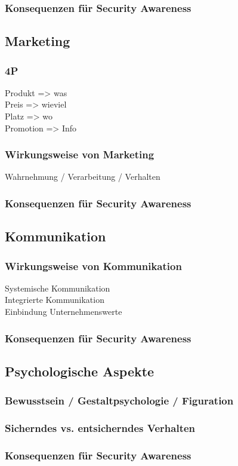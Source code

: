 \documentclass[../../main.tex]{subfiles}
\begin{document}
\subsubsection{Konsequenzen für Security Awareness}
\subsection{Marketing}
\subsubsection{4P}
    Produkt => was\\
    Preis => wieviel\\
    Platz => wo\\
    Promotion => Info
\subsubsection{Wirkungsweise von Marketing}
    Wahrnehmung / Verarbeitung / Verhalten
\subsubsection{Konsequenzen für Security Awareness}
\subsection{Kommunikation}
\subsubsection{Wirkungsweise von Kommunikation}
    Systemische Kommunikation\\
    Integrierte Kommunikation\\
    Einbindung Unternehmenswerte
\subsubsection{Konsequenzen für Security Awareness}
\subsection{Psychologische Aspekte}
\subsubsection{Bewusstsein / Gestaltpsychologie / Figuration}
\subsubsection{Sicherndes vs. entsicherndes Verhalten}
\subsubsection{Konsequenzen für Security Awareness}
\end{document}
